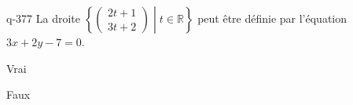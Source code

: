 \begin{truefalse}{q-377}
La droite  $\left\{\begin{pmatrix}2t+1\\3t+2\end{pmatrix}\middle| t\in\mathbb{R}\right\}$ peut être définie par l'équation $3x+2y-7=0$.
\item Vrai
\item* Faux
\end{truefalse}

